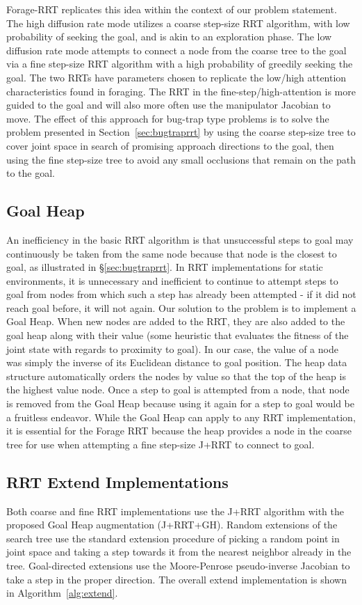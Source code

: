 \documentclass[conference]{IEEEtran}
\begin{document}
Forage-RRT replicates this idea within the context of our problem
statement.  The high diffusion rate mode utilizes a coarse step-size RRT
algorithm, with low probability of seeking the goal, and is akin to 
an exploration phase.  The low diffusion rate mode attempts to connect a node 
from the coarse tree to the goal via a fine step-size RRT algorithm with a
high probability of greedily seeking the goal.  The two RRTs have parameters
chosen to replicate the low/high attention characteristics found in
foraging.  The RRT in the fine-step/high-attention is more guided to the 
goal and will also more often use the manipulator Jacobian to move.  The
effect of this approach for bug-trap type problems is to solve the problem
presented in Section~\ref{sec:bugtraprrt} by using the coarse step-size tree
to cover joint space in search of promising approach directions to the goal,
then using the fine step-size tree to avoid any small occlusions that remain
on the path to the goal.

\subsection{Goal Heap}
An inefficiency in the basic RRT algorithm is that unsuccessful steps to
goal may continuously be taken from the same node because that node is the
closest to goal, as illustrated in \S\ref{sec:bugtraprrt}.
In RRT implementations for static environments, it is unnecessary and
inefficient to continue to attempt steps to goal from nodes from which such
a step has already been attempted - if it did not reach goal before, it will
not again.  Our solution to the problem is to implement a Goal Heap. 
When new nodes are added to the RRT, they are also added to the goal heap
along with their value (some heuristic that evaluates the fitness of the
joint state with regards to proximity to goal). In our case, the value of a
node was simply the inverse of its Euclidean distance to goal position. The
heap data structure automatically orders the nodes by value so that the top
of the heap is the highest value node. Once a step to goal is attempted from
a node, that node is removed from the Goal Heap because using it again for a
step to goal would be a fruitless endeavor.  While the Goal Heap can apply
to any RRT implementation, it is essential for the Forage RRT because the
heap provides a node in the coarse tree for use when attempting a fine 
step-size J+RRT to connect to goal.

\subsection{RRT Extend Implementations}
Both coarse and fine RRT implementations use the J+RRT algorithm 
\cite{vahrenkamp09} with the proposed Goal Heap augmentation (J+RRT+GH).  
Random extensions of the search tree use the
standard extension procedure of picking a random point in joint space and
taking a step towards it from the nearest neighbor already in the tree. 
Goal-directed extensions use the Moore-Penrose pseudo-inverse Jacobian to 
take a step in the proper direction.  The overall extend implementation is 
shown in Algorithm~\ref{alg:extend}. 
\end{document}
